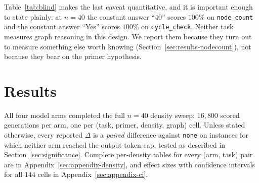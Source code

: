 \documentclass[11pt]{article}
\begin{document}
\begin{table}[t]
\centering
\footnotesize
\setlength{\tabcolsep}{4pt}
\caption{Blind baselines: accuracy of always returning the modal gold
answer, by density. This is the floor a model must clear before any primer
effect on that task means anything, and it is the reason
\texttt{node\_count} and \texttt{cycle\_check} carry no information at
$n{=}40$ --- their gold answer is constant, so a model can be perfect
without reading the graph. Only \texttt{node\_degree},
\texttt{edge\_count} and \texttt{connected\_nodes} have real headroom at
every density.}
\label{tab:blind}
\end{table}

Table~\ref{tab:blind} makes the last caveat quantitative, and it is
important enough to state plainly: at $n{=}40$ the constant answer ``40''
scores $100\%$ on \texttt{node\_count} and the constant answer ``Yes''
scores $100\%$ on \texttt{cycle\_check}. Neither task measures graph
reasoning in this design. We report them because they turn out to measure
something else worth knowing (Section~\ref{sec:results-nodecount}), not
because they bear on the primer hypothesis.

\section{Results}
\label{sec:results}

All four model arms completed the full $n{=}40$ density sweep:
$16{,}800$ scored generations per arm, one per (task, primer, density,
graph) cell. Unless stated otherwise, every reported $\Delta$ is a
\emph{paired} difference against \texttt{none} on instances for which
neither arm reached the output-token cap, tested as described in
Section~\ref{sec:significance}. Complete per-density tables for every
(arm, task) pair are in Appendix~\ref{sec:appendix-density}, and effect
sizes with confidence intervals for all $144$ cells in
Appendix~\ref{sec:appendix-ci}.
\end{document}
